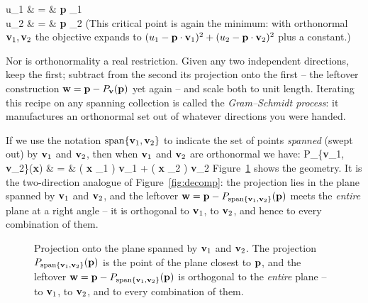 \documentclass[12pt]{article}
\begin{document}
\be
  u_1 & = & {\bf p} _1 \\
  u_2 & = & {\bf p} _2
\ee
(This critical point is again the minimum: with orthonormal
${\bf v}_1, {\bf v}_2$ the objective expands to
$(u_1 - {\bf p} \cdot {\bf v}_1)^2 + (u_2 - {\bf p} \cdot {\bf v}_2)^2$
plus a constant.)

Nor is orthonormality a real restriction. Given any two independent
directions, keep the first; subtract from the second its projection onto
the first -- the leftover construction ${\bf w} = {\bf p} - P_{\bf v}({\bf p})$
yet again -- and scale both to unit length. Iterating this recipe on any
spanning collection is called the {\em Gram--Schmidt process\/}: it
manufactures an orthonormal set out of whatever directions you were
handed.

If we use the notation $\mathrm{span}\{{\bf v}_1, {\bf v}_2\}$ to indicate
the set of points {\em spanned\/} (swept out) by ${\bf v}_1$ and ${\bf v}_2$,
then when ${\bf v}_1$ and ${\bf v}_2$ are orthonormal we have:
\be
  P_{\{{\bf v}_1, {\bf v}_2\}}({\bf x}) & = & ( {\bf x} _1 ) {\bf v}_1 +  ( {\bf x} _2 ) {\bf v}_2  \label{proj2}
\ee
Figure~\ref{fig:plane} shows the geometry.  It is the two-direction
analogue of Figure~\ref{fig:decomp}: the projection lies in the plane
spanned by ${\bf v}_1$ and ${\bf v}_2$, and the leftover
${\bf w} = {\bf p} - P_{\mathrm{span}\{{\bf v}_1, {\bf v}_2\}}({\bf p})$
meets the {\em entire\/} plane at a right angle -- it is orthogonal to
${\bf v}_1$, to ${\bf v}_2$, and hence to every combination of them.

\begin{figure}[ht]
\centering
{}
\caption{Projection onto the plane spanned by ${\bf v}_1$ and
${\bf v}_2$.  The projection
$P_{\mathrm{span}\{{\bf v}_1, {\bf v}_2\}}({\bf p})$ is the point of the
plane closest to ${\bf p}$, and the leftover
${\bf w} = {\bf p} - P_{\mathrm{span}\{{\bf v}_1, {\bf v}_2\}}({\bf p})$
is orthogonal to the {\em entire\/} plane -- to ${\bf v}_1$, to
${\bf v}_2$, and to every combination of them.}
\label{fig:plane}
\end{figure}
\end{document}

